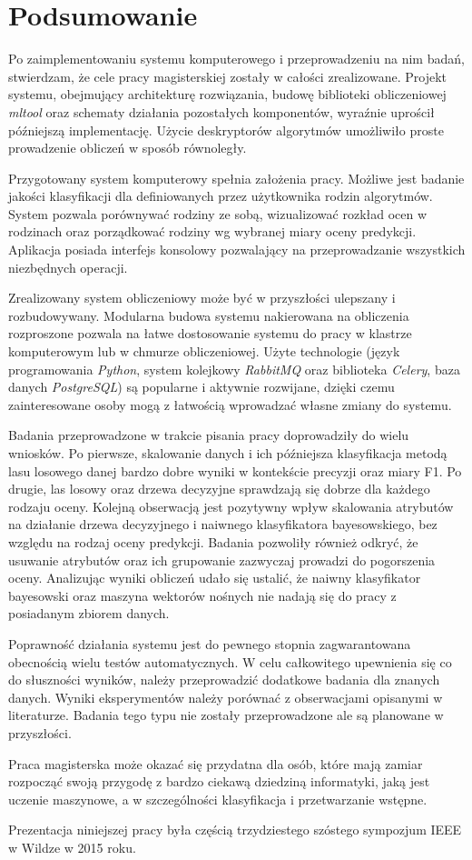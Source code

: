 \documentclass[../thesis.tex]{subfiles}
\begin{document}
\pagestyle{plain}
\chapter{Podsumowanie}

Po zaimplementowaniu systemu komputerowego i przeprowadzeniu na nim badań, stwierdzam, że cele pracy magisterskiej zostały w całości zrealizowane. Projekt systemu, obejmujący architekturę rozwiązania, budowę biblioteki obliczeniowej \emph{mltool} oraz schematy działania pozostałych komponentów, wyraźnie uprościł późniejszą implementację. Użycie deskryptorów algorytmów umożliwiło proste prowadzenie obliczeń w sposób równoległy. 

Przygotowany system komputerowy spełnia założenia pracy. Możliwe jest badanie jakości klasyfikacji dla definiowanych przez użytkownika rodzin algorytmów. System pozwala porównywać rodziny ze sobą, wizualizować rozkład ocen w rodzinach oraz porządkować rodziny wg wybranej miary oceny predykcji. Aplikacja posiada interfejs konsolowy pozwalający na przeprowadzanie wszystkich niezbędnych operacji.

Zrealizowany system obliczeniowy może być w przyszłości ulepszany i rozbudowywany. Modularna budowa systemu nakierowana na obliczenia rozproszone pozwala na łatwe dostosowanie systemu do pracy w klastrze komputerowym lub w chmurze obliczeniowej. Użyte technologie (język programowania \emph{Python}, system kolejkowy \emph{RabbitMQ} oraz biblioteka \emph{Celery}, baza danych \emph{PostgreSQL}) są popularne i aktywnie rozwijane, dzięki czemu zainteresowane osoby mogą z łatwością wprowadzać własne zmiany do systemu.

Badania przeprowadzone w trakcie pisania pracy doprowadziły do wielu wniosków. Po pierwsze, skalowanie danych i ich późniejsza klasyfikacja metodą lasu losowego danej bardzo dobre wyniki w kontekście precyzji oraz miary F1. Po drugie, las losowy oraz drzewa decyzyjne sprawdzają się dobrze dla każdego rodzaju oceny. Kolejną obserwacją jest pozytywny wpływ skalowania atrybutów na działanie drzewa decyzyjnego i naiwnego klasyfikatora bayesowskiego, bez względu na rodzaj oceny predykcji. Badania pozwoliły również odkryć, że usuwanie atrybutów oraz ich grupowanie zazwyczaj prowadzi do pogorszenia oceny. Analizując wyniki obliczeń udało się ustalić, że naiwny klasyfikator bayesowski oraz maszyna wektorów nośnych nie nadają się do pracy z posiadanym zbiorem danych.

Poprawność działania systemu jest do pewnego stopnia zagwarantowana obecnością wielu testów automatycznych. W celu całkowitego upewnienia się co do słuszności wyników, należy przeprowadzić dodatkowe badania dla znanych danych. Wyniki eksperymentów należy porównać z obserwacjami opisanymi w literaturze. Badania tego typu nie zostały przeprowadzone ale są planowane w przyszłości.

Praca magisterska może okazać się przydatna dla osób, które mają zamiar rozpocząć swoją przygodę z bardzo ciekawą dziedziną informatyki, jaką jest uczenie maszynowe, a w szczególności klasyfikacja i przetwarzanie wstępne.

Prezentacja niniejszej pracy była częścią trzydziestego szóstego sympozjum IEEE w Wildze w 2015 roku.
\end{document}
